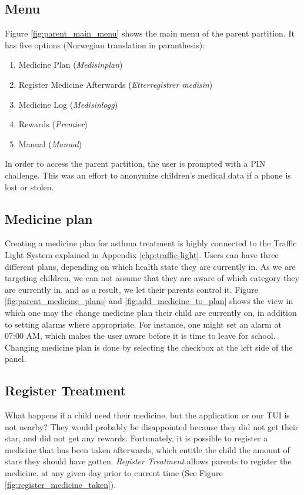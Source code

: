 \subsection{Menu}
\label{sec:description-menu}
Figure \ref{fig:parent_main_menu} shows the main menu of the parent partition. It has five options (Norwegian translation in paranthesis):
\begin{enumerate}
  \item Medicine Plan (\emph{Medisinplan})
  \item Register Medicine Afterwards (\emph{Etterregistrer medisin})
  \item Medicine Log (\emph{Medisinlogg})
  \item Rewards (\emph{Premier})
  \item Manual (\emph{Manual})
\end{enumerate} 

In order to access the parent partition, the user is prompted with a PIN challenge. This was an effort to anonymize children's medical data if a phone is lost or stolen. 

\subsection{Medicine plan}
\label{sec:description-medicine-plan}
Creating a medicine plan for asthma treatment is highly connected to the Traffic Light System explained in Appendix \ref{chp:traffic-light}.
Users can have three different plans, depending on which health state they are currently in. As we are targeting children, we can not assume that they are aware of which category they are currently in, and as a result, we let their parents control it. Figure \ref{fig:parent_medicine_plans} and \ref{fig:add_medicine_to_plan} shows the view in which one may the change medicine plan their child are currently on, in addition to setting alarms where appropriate. For instance, one might set an alarm at 07:00 AM, which makes the user aware before it is time to leave for school. Changing medicine plan is done by selecting the checkbox at the left side of the panel.  


\subsection{Register Treatment}
\label{sec:description-register-medicine}
What happens if a child need their medicine, but the application or our TUI is not nearby? They would probably be disappointed because they did not get their star, and did not get any rewards. Fortunately, it is possible to register a medicine that has been taken afterwards, which entitle the child the amount of stars they should have gotten. \emph{Register Treatment} allows parents to register the medicine, at any given day prior to current time (See Figure \ref{fig:register_medicine_taken}).  


